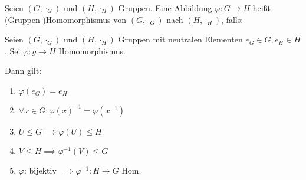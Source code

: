 \documentclass{../../meta/tudscript}
\begin{document}
\setcounter{section}{11}
\setcounter{subsection}{17}
        Seien $(G, \cdot_G)$ und $(H, \cdot_H)$ Gruppen. Eine Abbildung
        $\varphi: G \rightarrow H$ heißt \underline{(Gruppen-)Homomorphismus}
        von $(G, \cdot_G)$ nach $(H, \cdot_H)$, falls:


        Seien $(G, \cdot_G)$ und $(H, \cdot_H)$ Gruppen mit neutralen Elementen
        $e_G \in G, e_H \in H$. Sei $\varphi: g \rightarrow H$ Homomorphismus.
        
        Dann gilt:
        \begin{enumerate}
            \item $\varphi (e_G) = e_H$
            \item $\forall x \in G: \varphi (x)^{-1} = \varphi (x^{-1})$
            \item $U \leq G \implies \varphi (U) \leq H$
            \item $V \leq H \implies \varphi^{-1} (V) \leq G$
            \item $\varphi$: bijektiv $\implies \varphi^{-1}: H \rightarrow G$ Hom.
        \end{enumerate}
\end{document}

